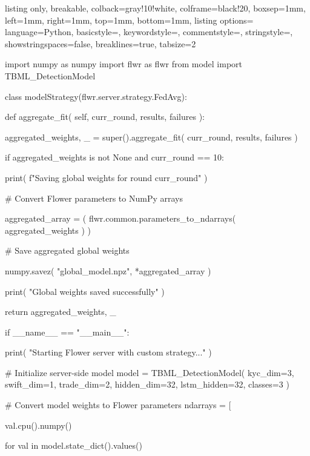 \begin{tcblisting}{
listing only,
breakable,
colback=gray!10!white,
colframe=black!20,
boxsep=1mm,
left=1mm,
right=1mm,
top=1mm,
bottom=1mm,
listing options={
language=Python,
basicstyle=\scriptsize\ttfamily,
keywordstyle=\color{blue},
commentstyle=\color{gray},
stringstyle=\color{orange},
showstringspaces=false,
breaklines=true,
tabsize=2
}
}

import numpy as numpy
import flwr as flwr
from model import TBML_DetectionModel

class modelStrategy(flwr.server.strategy.FedAvg):

    def aggregate_fit(
        self,
        curr_round,
        results,
        failures
    ):

        aggregated_weights, _ = super().aggregate_fit(
            curr_round,
            results,
            failures
        )

        if aggregated_weights is not None and curr_round == 10:

            print(
                f"Saving global weights for round {curr_round}"
            )

            # Convert Flower parameters to NumPy arrays

            aggregated_array = (
                flwr.common.parameters_to_ndarrays(
                    aggregated_weights
                )
            )

            # Save aggregated global weights

            numpy.savez(
                "global_model.npz",
                *aggregated_array
            )

            print(
                "Global weights saved successfully"
            )

        return aggregated_weights, _


if __name__ == "__main__":

    print(
        "Starting Flower server with custom strategy..."
    )

    # Initialize server-side model
    model = TBML_DetectionModel(
        kyc_dim=3,
        swift_dim=1,
        trade_dim=2,
        hidden_dim=32,
        lstm_hidden=32,
        classes=3
    )

    # Convert model weights to Flower parameters
    ndarrays = [

        val.cpu().numpy()

        for val in model.state_dict().values()


\end{tcblisting}

